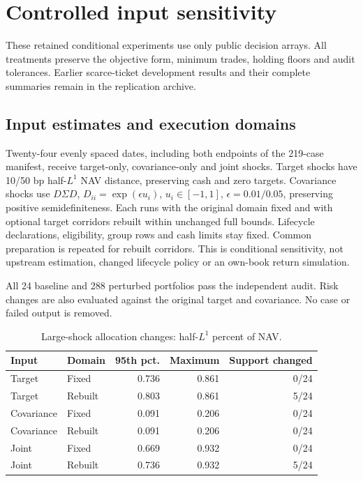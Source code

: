 \section{Controlled input sensitivity}\label{sec:robustness}

These retained conditional experiments use only public decision arrays. All treatments preserve the objective form, minimum trades, holding floors and audit tolerances. Earlier scarce-ticket development results and their complete summaries remain in the replication archive.

\subsection{Input estimates and execution domains}

Twenty-four evenly spaced dates, including both endpoints of the 219-case manifest, receive target-only, covariance-only and joint shocks. Target shocks have 10/50 bp half-$L^1$ NAV distance, preserving cash and zero targets. Covariance shocks use $D\Sigma D$, $D_{ii}=\exp(\epsilon u_i)$, $u_i\in[-1,1]$, $\epsilon=0.01/0.05$, preserving positive semidefiniteness. Each runs with the original domain fixed and with optional target corridors rebuilt within unchanged full bounds. Lifecycle declarations, eligibility, group rows and cash limits stay fixed. Common preparation is repeated for rebuilt corridors. This is conditional sensitivity, not upstream estimation, changed lifecycle policy or an own-book return simulation.

All 24 baseline and 288 perturbed portfolios pass the independent audit. Risk changes are also evaluated against the original target and covariance. No case or failed output is removed.

\begin{table}[htbp]\centering\small

\caption{Large-shock allocation changes: half-$L^1$ percent of NAV.}

\begin{tabular}{llrrr}\toprule

Input & Domain & 95th pct. & Maximum & Support changed\\\midrule

Target & Fixed & 0.736 & 0.861 & 0/24\\

Target & Rebuilt & 0.803 & 0.861 & 5/24\\

Covariance & Fixed & 0.091 & 0.206 & 0/24\\

Covariance & Rebuilt & 0.091 & 0.206 & 0/24\\

Joint & Fixed & 0.669 & 0.932 & 0/24\\

Joint & Rebuilt & 0.736 & 0.932 & 5/24\\

\bottomrule\end{tabular}\end{table}

